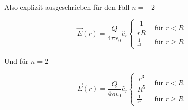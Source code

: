 \documentclass[a4paper,german,12pt,smallheadings]{scrartcl}
\begin{document}
\begin{enumerate}[a)]
    Also explizit ausgeschrieben für den Fall $n = -2$

    \begin{equation}
      \vec{E}(r) = \dfrac{Q}{4 \pi \epsilon_0} \hat{e}_r \begin{cases}
        \dfrac{1}{rR} & \text{ für } r < R \\
        \frac{1}{r^2} & \text{ für } r \ge R
      \end{cases}
    \end{equation}

    Und für $n = 2$

    \begin{equation}
      \vec{E}(r) = \dfrac{Q}{4 \pi \epsilon_0} \hat{e}_r \begin{cases}
        \dfrac{r^3}{R^5} & \text{ für } r < R \\
        \frac{1}{r^2} & \text{ für } r \ge R
      \end{cases}
    \end{equation}

\end{enumerate}
\end{document}
